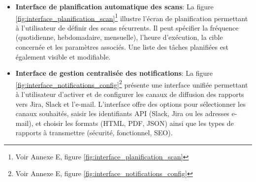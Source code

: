 \begin{itemize}[label=$\bullet$]
    \item \textbf{Interface de planification automatique des scans}:  
    La figure \ref{fig:interface_planification_scan}\footnote{Voir Annexe E, figure \ref{fig:interface_planification_scan}} illustre l’écran de planification permettant à l’utilisateur de définir des scans récurrents. Il peut spécifier la fréquence (quotidienne, hebdomadaire, mensuelle), l’heure d’exécution, la cible concernée et les paramètres associés. Une liste des tâches planifiées est également visible et modifiable.
    
    \item \textbf{Interface de gestion centralisée des notifications}: La figure \ref{fig:interface_notifications_config}\footnote{Voir Annexe E, figure \ref{fig:interface_notifications_config}} présente une interface unifiée permettant à l’utilisateur d’activer et de configurer les canaux de diffusion des rapports vers Jira, Slack et l’e-mail. L’interface offre des options pour sélectionner les canaux souhaités, saisir les identifiants API (Slack, Jira ou les adresses e-mail), et choisir les formats (HTML, PDF, JSON) ainsi que les types de rapports à transmettre (sécurité, fonctionnel, SEO).
\end{itemize}

